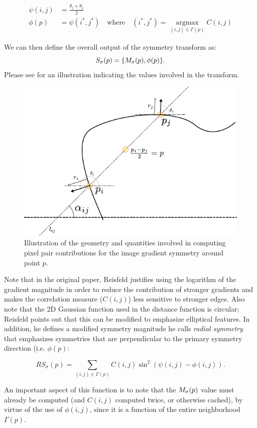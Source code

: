 \begin{align}
\psi(i,j) &= \frac{\theta_i + \theta_j}{2} \\
\phi(p)   &= \psi(i^*,j^*)\quad\mathrm{where}\quad(i^*,j^*) = \operatorname*{argmax}_{(i,j) \in \Gamma(p)} C(i,j)
\end{align} 

We can then define the overall output of the symmetry transform as:
\[S_\sigma(p) = \{M_\sigma(p), \phi(p)\}.\] Please see  for an illustration indicating the values involved in the transform.

\Needspace{0.3\textheight}
\begin{figure}[ht]
\centering
\includegraphics[width=0.6\linewidth]{figures/pixel_contributions.pdf}
\caption{\label{fig:pixel-contr}
Illustration of the geometry and quantities involved in computing pixel pair contributions for the image gradient symmetry around point \(p\).}
\end{figure}

Note that in the original paper, Reisfeld justifies using the logarithm of the gradient magnitude in order to reduce the contribution of stronger gradients and makes the correlation measure (\(C(i,j)\)) less sensitive to stronger edges. Also note that the 2D Gaussian function used in the distance function is circular; Reisfeld points out that this can be modified to emphasize elliptical features. In addition, he defines a modified symmetry magnitude he calls \emph{radial symmetry} that emphasizes symmetries that are perpendicular to the primary symmetry direction (i.e. \(\phi(p)\):

\[ RS_\sigma(p) = \sum_{(i,j) \in \Gamma(p)} C(i,j) \sin^2 \left(\psi(i,j) - \phi(i,j)\right). \] 

An important aspect of this function is to note that the \(M_\sigma(p)\) value must already be computed (and \(C(i,j)\) computed twice, or otherwise cached), by virtue of the use of \(\phi(i,j)\), since it is a function of the entire neighborhood \(\Gamma(p)\).

